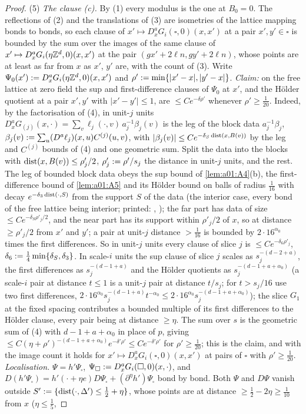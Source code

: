 \begin{proof}
(5) \emph{The clause (c).} By (1) every modulus is the one at $B_0=0$. The reflections of (2) and the translations of (3) are isometries of the lattice mapping bonds to bonds, so each clause of $x'\mapsto D^a_xG_i(\square,0)(x,x')$ at a pair $x',y'\in\square$ is bounded by the sum over the images of the same clause of $x'\mapsto D^a_xG_i(\eta\mathbb Z^d,0)(x,x')$ at the pair $(gx'+2\ell n,gy'+2\ell n)$, whose points are at least as far from $x$ as $x'$, $y'$ are, with the count of (3). Write $\Psi_0(x'):= D^a_xG_i(\eta\mathbb Z^d,0)(x,x')$ and $\rho':=\min\{|x'-x|,|y'-x|\}$. \emph{Claim:} on the free lattice at zero field the sup and first-difference clauses of $\Psi_0$ at $x'$, and the H\"older quotient at a pair $x',y'$ with $|x'-y'|\le1$, are $\le Ce^{-\delta\rho'}$ whenever $\rho'\ge\frac1{20}$. Indeed, by the factorisation of (4), in unit-$j$ units $D^a_xG_{(j)}(x,\cdot)=\sum_v\ell_j(\cdot,v)\,a_j^{-1}\beta_j(v)$ is the leg of the block data $a_j^{-1}\beta_j$, $\beta_j(v):=\sum_u(D^a\ell_j)(x,u)C^{(j)}(u,v)$, with $|\beta_j(v)|\le Ce^{-\delta_S\operatorname{dist}(x,B(v))}$ by the leg and $C^{(j)}$ bounds of (4) and one geometric sum. Split the data into the blocks with $\operatorname{dist}(x,B(v))\le\rho'_j/2$, $\rho'_j:=\rho'/s_j$ the distance in unit-$j$ units, and the rest. The leg of bounded block data obeys the sup bound of \cref{lem:a01:A4}(b), the first-difference bound of \cref{lem:a01:A5} and its H\"older bound on balls of radius $\frac1{16}$ with decay $e^{-\delta_3\operatorname{dist}(\cdot,S)}$ from the support $S$ of the data (the interior case, every bond of the free lattice being interior; printed: \cite[(3.63)--(3.65)]{K1}, \cite[(2.12)]{Ba3}); the far part has data of size $\le Ce^{-\delta_S\rho'_j/2}$, and the near part has its support within $\rho'_j/2$ of $x$, so at distance $\ge\rho'_j/2$ from $x'$ and $y'$; a pair at unit-$j$ distance $>\frac1{16}$ is bounded by $2\cdot16^{\alpha_0}$ times the first differences. So in unit-$j$ units every clause of slice $j$ is $\le Ce^{-\delta_6\rho'_j}$, $\delta_6:=\frac14\min\{\delta_S,\delta_3\}$. In scale-$i$ units the sup clause of slice $j$ scales as $s_j^{-(d-2+a)}$, the first differences as $s_j^{-(d-1+a)}$ and the H\"older quotients as $s_j^{-(d-1+a+\alpha_0)}$ (a scale-$i$ pair at distance $t\le1$ is a unit-$j$ pair at distance $t/s_j$; for $t>s_j/16$ use two first differences, $2\cdot16^{\alpha_0}s_j^{-(d-1+a)}t^{-\alpha_0}\le2\cdot16^{\alpha_0}s_j^{-(d-1+a+\alpha_0)}$); the slice $G_1$ at the fixed spacing contributes a bounded multiple of its first differences to the H\"older clause, every pair being at distance $\ge\eta$. The sum over $s$ is the geometric sum of (4) with $d-1+a+\alpha_0$ in place of $p$, giving $\le C(\eta+\rho')^{-(d-1+a+\alpha_0)}e^{-\delta'\rho'}\le Ce^{-\delta'\rho'}$ for $\rho'\ge\frac1{20}$; this is the claim, and with the image count it holds for $x'\mapsto D^a_xG_i(\square,0)(x,x')$ at pairs of $\square$ with $\rho'\ge\frac1{20}$. \emph{Localisation.} $\Psi=h'\Psi_\square$, $\Psi_\square:= D^a_xG_i(\square,0)(x,\cdot)$, and $D(h'\Psi_\square)=h'(\cdot+\eta e)D\Psi_\square+(\partial^\eta h')\Psi_\square$ bond by bond. Both $\Psi$ and $D\Psi$ vanish outside $S':=\{\operatorname{dist}(\cdot,\Delta')\le\frac12+\eta\}$, whose points are at distance $\ge\frac12-2\eta\ge\frac1{10}$ from $x$ ($\eta\le\frac15$, 
\end{proof}
